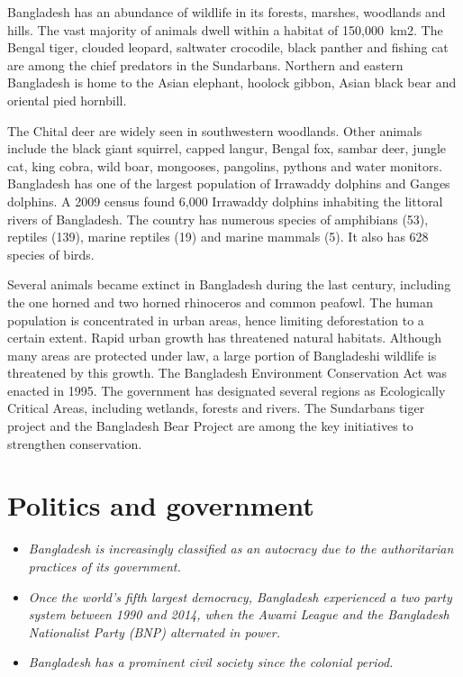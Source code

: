 Bangladesh has an abundance of wildlife in its forests, marshes,
woodlands and hills. The vast majority of animals dwell within a habitat
of 150,000~km2. The Bengal tiger, clouded leopard, saltwater crocodile,
black panther and fishing cat are among the chief predators in the
Sundarbans. Northern and eastern Bangladesh is home to the Asian
elephant, hoolock gibbon, Asian black bear and oriental pied hornbill.

The Chital deer are widely seen in southwestern woodlands. Other animals
include the black giant squirrel, capped langur, Bengal fox, sambar
deer, jungle cat, king cobra, wild boar, mongooses, pangolins, pythons
and water monitors. Bangladesh has one of the largest population of
Irrawaddy dolphins and Ganges dolphins. A 2009 census found 6,000
Irrawaddy dolphins inhabiting the littoral rivers of Bangladesh. The
country has numerous species of amphibians (53), reptiles (139), marine
reptiles (19) and marine mammals (5). It also has 628 species of birds.

Several animals became extinct in Bangladesh during the last century,
including the one horned and two horned rhinoceros and common peafowl.
The human population is concentrated in urban areas, hence limiting
deforestation to a certain extent. Rapid urban growth has threatened
natural habitats. Although many areas are protected under law, a large
portion of Bangladeshi wildlife is threatened by this growth. The
Bangladesh Environment Conservation Act was enacted in 1995. The
government has designated several regions as Ecologically Critical
Areas, including wetlands, forests and rivers. The Sundarbans tiger
project and the Bangladesh Bear Project are among the key initiatives to
strengthen conservation.

\section{Politics and government}\label{politics-and-government}

\begin{itemize}
\item
  \emph{Bangladesh is increasingly classified as an autocracy due to the
  authoritarian practices of its government.}
\item
  \emph{Once the world's fifth largest democracy, Bangladesh experienced
  a two party system between 1990 and 2014, when the Awami League and
  the Bangladesh Nationalist Party (BNP) alternated in power.}
\item
  \emph{Bangladesh has a prominent civil society since the colonial
  period.}
\end{itemize}

